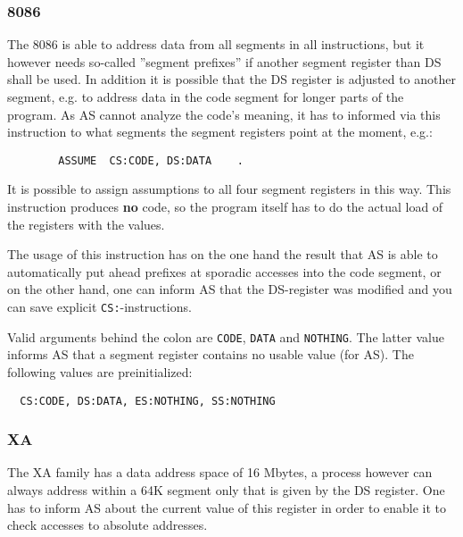 \documentclass[12pt,twoside]{report}
\newcommand{\bb}[1]{{\bf #1}}
\newcommand{\tty}[1]{{\tt #1}}
\begin{document}

\subsubsection{8086}

The 8086 is able to address data from all segments in all
instructions, but it however needs so-called ''segment prefixes'' if
another segment register than DS shall be used.  In addition it is
possible that the DS register is adjusted to another segment, e.g. to
address data in the code segment for longer parts of the program.  As
AS cannot analyze the code's meaning, it has to informed via this
instruction to what segments the segment registers point at the
moment, e.g.:
\begin{verbatim}
        ASSUME  CS:CODE, DS:DATA    .
\end{verbatim}
It is possible to assign assumptions to all four segment registers in
this way.  This instruction produces \bb{no} code, so the program itself
has to do the actual load of the registers with the values. 

The usage of this instruction has on the one hand the result that AS is
able to automatically put ahead prefixes at sporadic accesses into the
code segment, or on the other hand, one can inform AS that the DS-register
was modified and you can save explicit \tty{CS:}-instructions.

Valid arguments behind the colon are \tty{CODE}, \tty{DATA} and
\tty{NOTHING}.  The latter value informs AS that a segment register
contains no usable value (for AS).  The following values are
preinitialized:
\begin{verbatim}
  CS:CODE, DS:DATA, ES:NOTHING, SS:NOTHING
\end{verbatim}


\subsubsection{XA}

The XA family has a data address space of 16 Mbytes, a process however
can always address within a 64K segment only that is given by the DS
register.  One has to inform AS about the current value of this
register in order to enable it to check accesses to absolute
addresses.

\end{document}
